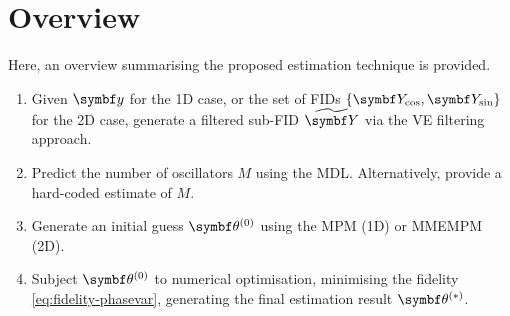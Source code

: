 \section{Overview}
Here, an overview summarising the proposed estimation technique is provided.

\begin{enumerate}
    \item Given  $\by$ for the \ac{1D} case, or the set of \acp{FID}
        $\lbrace \bY_{\cos}, \bY_{\sin} \rbrace$ for the \ac{2D} case,
        generate a filtered sub-FID $\widetilde{\bY}$ via the \ac{VE}
        filtering approach.
    \item Predict the number of oscillators $M$ using the \ac{MDL}.
        Alternatively, provide a hard-coded estimate of $M$.
    \item Generate an initial guess $\bthzero$ using the \ac{MPM} (\ac{1D}) or
        \ac{MMEMPM} (\ac{2D}).
    \item Subject $\bthzero$ to numerical optimisation, minimising the fidelity
        \eqref{eq:fidelity-phasevar}, generating the final estimation result
        $\bthstar$.
\end{enumerate}

